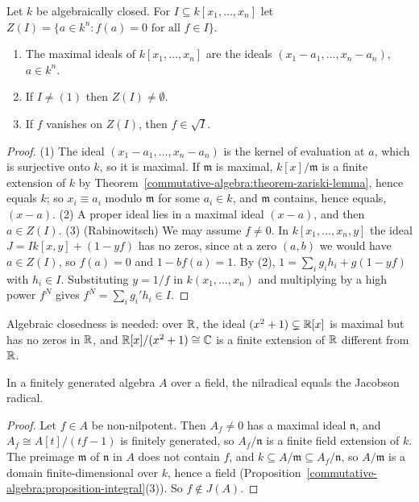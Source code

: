 \begin{theorem}\label{commutative-algebra:theorem-nullstellensatz}
Let $k$ be algebraically closed. For $I \subseteq k[x_1, \ldots, x_n]$ let
$Z(I) = \{a \in k^n : f(a) = 0 \text{ for all } f \in I\}$.
\begin{enumerate}
\item The maximal ideals of $k[x_1, \ldots, x_n]$ are the ideals $(x_1 - a_1, \ldots, x_n - a_n)$, $a \in k^n$.
\item If $I \neq (1)$ then $Z(I) \neq \emptyset$.
\item If $f$ vanishes on $Z(I)$, then $f \in \sqrt I$.
\end{enumerate}
\end{theorem}

\begin{proof}
(1) The ideal $(x_1 - a_1, \ldots, x_n - a_n)$ is the kernel of evaluation at $a$, which is surjective onto $k$, so it is maximal.
If $\mathfrak{m}$ is maximal, $k[x]/\mathfrak{m}$ is a finite extension of $k$ by Theorem~\ref{commutative-algebra:theorem-zariski-lemma}, hence
equals $k$; so $x_i \equiv a_i$ modulo $\mathfrak{m}$ for some $a_i \in k$, and $\mathfrak{m}$ contains, hence equals, $(x - a)$.
(2) A proper ideal lies in a maximal ideal $(x - a)$, and then $a \in Z(I)$.
(3) (Rabinowitsch) We may assume $f \neq 0$. In $k[x_1, \ldots, x_n, y]$ the ideal $J = Ik[x, y] + (1 - yf)$ has no zeros, since at a zero $(a, b)$ we would have
$a \in Z(I)$, so $f(a) = 0$ and $1 - bf(a) = 1$. By (2), $1 = \sum_i g_ih_i + g(1 - yf)$ with $h_i \in I$. Substituting $y = 1/f$ in
$k(x_1, \ldots, x_n)$ and multiplying by a high power $f^N$ gives $f^N = \sum_i g_i'h_i \in I$.
\end{proof}

\begin{counterexample}\label{commutative-algebra:counterexample-nullstellensatz-real}
Algebraic closedness is needed: over $\mathbb{R}$, the ideal $(x^2 + 1) \subsetneq \mathbb{R}[x]$ is maximal but has no zeros in $\mathbb{R}$, and
$\mathbb{R}[x]/(x^2 + 1) \cong \mathbb{C}$ is a finite extension of $\mathbb{R}$ different from $\mathbb{R}$.
\end{counterexample}

\begin{corollary}\label{commutative-algebra:corollary-jacobson}
In a finitely generated algebra $A$ over a field, the nilradical equals the Jacobson radical.
\end{corollary}

\begin{proof}
Let $f \in A$ be non-nilpotent. Then $A_f \neq 0$ has a maximal ideal $\mathfrak{n}$, and $A_f \cong A[t]/(tf - 1)$ is finitely generated, so
$A_f/\mathfrak{n}$ is a finite field extension of $k$. The preimage $\mathfrak{m}$ of $\mathfrak{n}$ in $A$ does not contain $f$, and
$k \subseteq A/\mathfrak{m} \subseteq A_f/\mathfrak{n}$, so $A/\mathfrak{m}$ is a domain finite-dimensional over $k$, hence a field
(Proposition~\ref{commutative-algebra:proposition-integral}(3)). So $f \notin J(A)$.
\end{proof}

